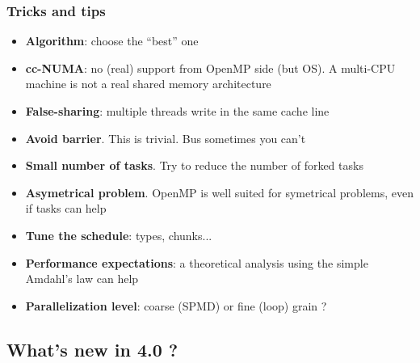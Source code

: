 \begin{frame}
\frametitle{Tricks and tips}

\begin{block}{}
\begin{itemize}
\item{\textbf{Algorithm}: choose the ``best'' one}
\item{\textbf{cc-NUMA}: no (real) support from OpenMP side (but OS). A multi-CPU machine is not a real shared memory architecture}
\item{\textbf{False-sharing}: multiple threads write in the same cache line}
\item{\textbf{Avoid barrier}. This is trivial. Bus sometimes you can't}
\item{\textbf{Small number of tasks}. Try to reduce the number of forked tasks}
\item{\textbf{Asymetrical problem}. OpenMP is well suited for symetrical problems, even if tasks can help}
\item{\textbf{Tune the schedule}: types, chunks...}
\item{\textbf{Performance expectations}: a theoretical analysis using the simple Amdahl's law can help}
\item{\textbf{Parallelization level}: coarse (SPMD) or fine (loop) grain ?}
\end{itemize}
\end{block}

\end{frame}




\subsection{What's new in 4.0 ?}


